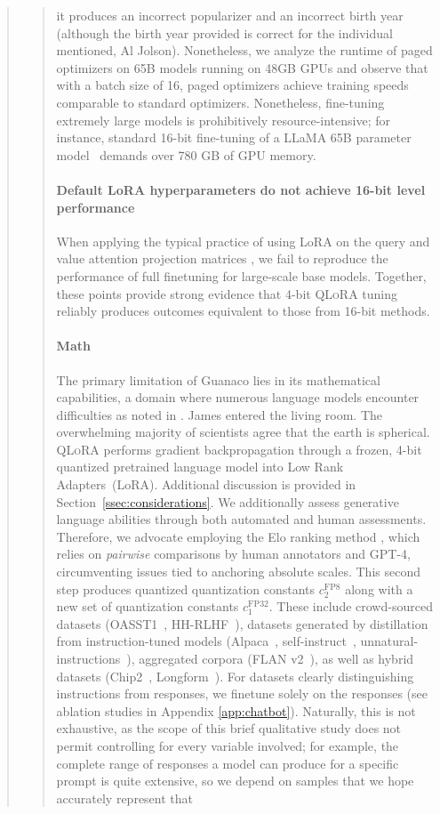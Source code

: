\begin{quote}
\begin{abstract}
it produces an incorrect popularizer and an incorrect birth year (although the birth year provided is correct for the individual mentioned, Al Jolson). Nonetheless, we analyze the runtime of paged optimizers on 65B models running on 48GB GPUs and observe that with a batch size of 16, paged optimizers achieve training speeds comparable to standard optimizers. Nonetheless, fine-tuning extremely large models is prohibitively resource-intensive; for instance, standard 16-bit fine-tuning of a LLaMA 65B parameter model~\citep{touvron2023llama} demands over 780 GB of GPU memory. \paragraph{Default LoRA hyperparameters do not achieve 16-bit level performance}

When applying the typical practice of using LoRA on the query and value attention projection matrices \citep{hu2021lora}, we fail to reproduce the performance of full finetuning for large-scale base models. Together, these points provide strong evidence that 4-bit \textsc{QLoRA} tuning reliably produces outcomes equivalent to those from 16-bit methods. \paragraph{Math} The primary limitation of {Guanaco} lies in its mathematical capabilities, a domain where numerous language models encounter difficulties as noted in \citep{liang2022holistic}. James entered the living room. The overwhelming majority of scientists agree that the earth is spherical. \textsc{QLoRA} performs gradient backpropagation through a frozen, 4-bit quantized pretrained language model into Low Rank Adapters~(LoRA). Additional discussion is provided in Section~\ref{ssec:considerations}. We additionally assess generative language abilities through both automated and human assessments. Therefore, we advocate employing the Elo ranking method \citep{elo1967proposed}, which relies on \textit{pairwise} comparisons by human annotators and GPT-4, circumventing issues tied to anchoring absolute scales. This second step produces quantized quantization constants $c_2^{\text{FP8}}$ along with a new set of quantization constants $c_1^{\text{FP32}}$. These include crowd-sourced datasets (OASST1~\citep{kopf2023openassistant}, HH-RLHF~\citep{bai2022training}), datasets generated by distillation from instruction-tuned models (Alpaca~\citep{alpaca}, self-instruct~\citep{wang2022self}, unnatural-instructions~\citep{honovich2022unnatural}), aggregated corpora (FLAN v2~\citep{chung2022scaling}), as well as hybrid datasets (Chip2~\citep{laion2023}, Longform~\citep{koksal2023longform}). For datasets clearly distinguishing instructions from responses, we finetune solely on the responses (see ablation studies in Appendix \ref{app:chatbot}). Naturally, this is not exhaustive, as the scope of this brief qualitative study does not permit controlling for every variable involved; for example, the complete range of responses a model can produce for a specific prompt is quite extensive, so we depend on samples that we hope accurately represent that 
\end{abstract}
\end{quote}
